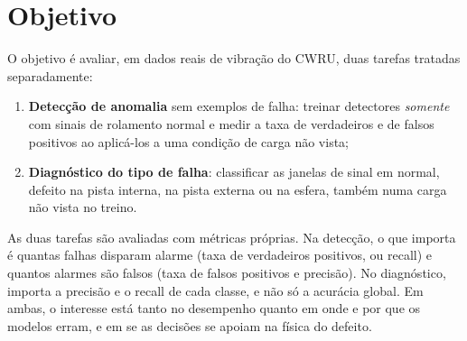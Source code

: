 \section{Objetivo}
\label{sec:objetivo}

O objetivo é avaliar, em dados reais de vibração do CWRU, duas tarefas tratadas
separadamente:
\begin{enumerate}
  \item \textbf{Detecção de anomalia} sem exemplos de falha: treinar detectores
  \emph{somente} com sinais de rolamento normal e medir a taxa de verdadeiros e de
  falsos positivos ao aplicá-los a uma condição de carga não vista;
  \item \textbf{Diagnóstico do tipo de falha}: classificar as janelas de sinal em
  normal, defeito na pista interna, na pista externa ou na esfera, também numa
  carga não vista no treino.
\end{enumerate}
As duas tarefas são avaliadas com métricas próprias. Na detecção, o que importa é
quantas falhas disparam alarme (taxa de verdadeiros positivos, ou recall) e
quantos alarmes são falsos (taxa de falsos positivos e precisão). No diagnóstico,
importa a precisão e o recall de cada classe, e não só a acurácia global. Em
ambas, o interesse está tanto no desempenho quanto em onde e por que os modelos
erram, e em se as decisões se apoiam na física do defeito.
